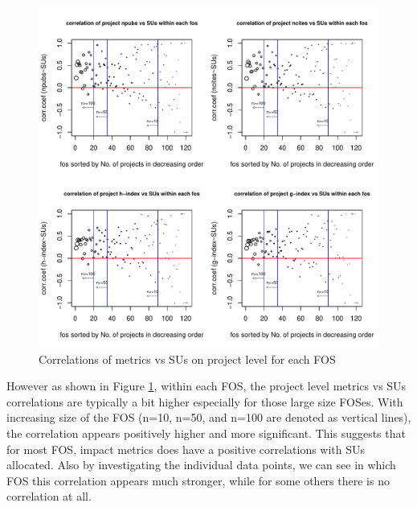\documentclass{sig-alternate}
\begin{document}
\begin{figure}[htb] 
  \centering 
    \includegraphics[width=1.0\columnwidth]{images/06_corr_metrics_vs_alloc_proj_by_fos.pdf} 
  \caption{Correlations of metrics vs SUs on project level for each FOS}\label{F:corr-metrics-vs-alloc-proj-by-fos} 
\end{figure} 
 
However as shown in Figure \ref{F:corr-metrics-vs-alloc-proj-by-fos}, within each FOS, the project level metrics vs SUs correlations are typically a bit higher especially for those large size FOSes. With increasing size of the FOS (n=10, n=50, and n=100 are denoted as vertical lines), the correlation appears positively higher and more significant. This suggests that for most FOS, impact metrics does have a positive correlations with SUs allocated. Also by investigating the individual data points, we can see in which FOS this correlation appears much stronger, while for some others there is no correlation at all. 
 
 
 
\end{document}
